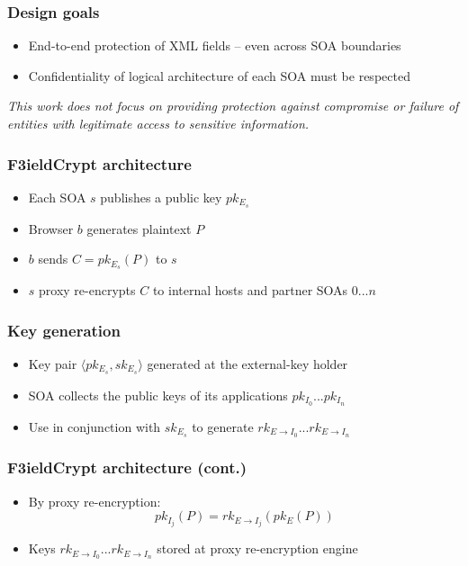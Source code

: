 \documentclass{beamer}
\begin{document}
\begin{frame}
\frametitle{Design goals}
\begin{itemize}
\item End-to-end protection of XML fields -- even across SOA boundaries
\item Confidentiality of logical architecture of each SOA must be respected
\end{itemize}
\medskip
\small{\emph{This work does not focus on providing protection against
compromise or failure of entities with legitimate access to sensitive
information.}}
\end{frame}

\begin{frame}
\frametitle{F3ieldCrypt architecture}
\begin{itemize}
\item Each SOA $s$ publishes a public key $pk_{E_s}$
\item Browser $b$ generates plaintext $P$
\item $b$ sends $C = pk_{E_s}(P)$ to $s$
\item $s$ proxy re-encrypts $C$ to internal hosts and partner SOAs $0...n$ 
\end{itemize}
\end{frame}

\begin{frame}
\frametitle{Key generation}
\begin{itemize}
\item Key pair $\langle pk_{E_s}, sk_{E_s} \rangle$ generated at the
\alert{external-key holder}
\item SOA collects the public keys of its applications $pk_{I_0}...pk_{I_n}$
\item Use in conjunction with $sk_{E_s}$ to generate $rk_{E \to I_0}...rk_{E
\to I_n}$
\end{itemize}
\end{frame}

\begin{frame}
\frametitle{F3ieldCrypt architecture (cont.)}
\begin{itemize}
\item By proxy re-encryption:
\begin{equation*}
pk_{I_j}(P) = rk_{E \to I_j}( pk_E (P))
\end{equation*}
\item Keys $rk_{E \to I_0}...rk_{E \to I_n}$ stored at \alert{proxy
re-encryption engine}
\end{itemize}
\end{frame}
\end{document}
